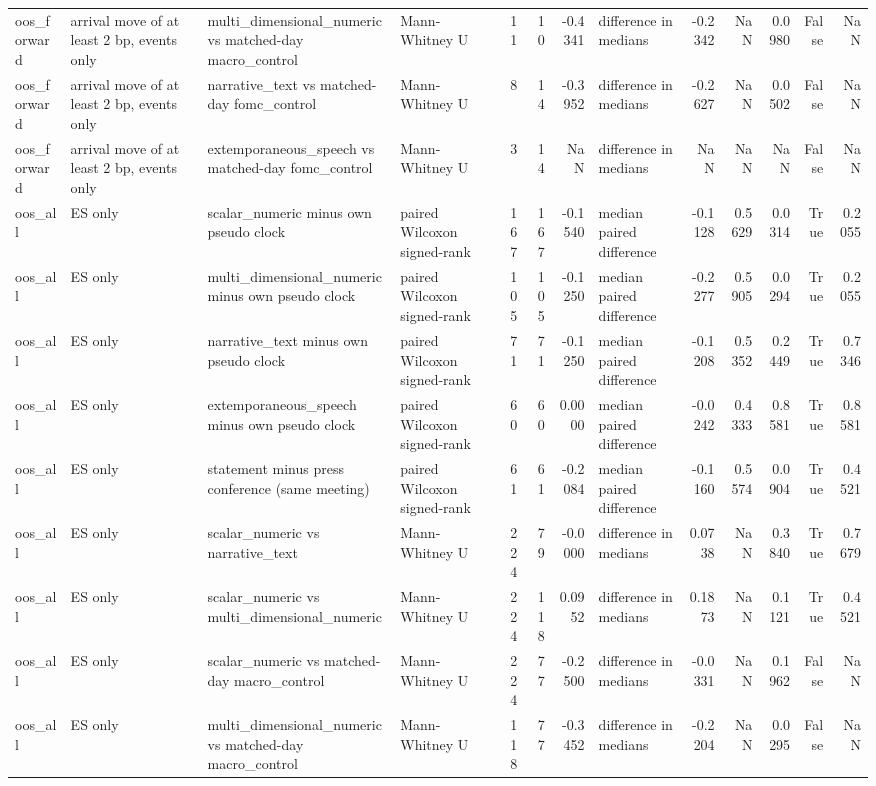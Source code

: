 \begin{tabular}{llllrrrlrrrrr}
oos_forward & arrival move of at least 2 bp, events only & multi_dimensional_numeric vs matched-day macro_control & Mann-Whitney U & 11 & 10 & -0.4341 & difference in medians & -0.2342 & NaN & 0.0980 & False & NaN \\
oos_forward & arrival move of at least 2 bp, events only & narrative_text vs matched-day fomc_control & Mann-Whitney U & 8 & 14 & -0.3952 & difference in medians & -0.2627 & NaN & 0.0502 & False & NaN \\
oos_forward & arrival move of at least 2 bp, events only & extemporaneous_speech vs matched-day fomc_control & Mann-Whitney U & 3 & 14 & NaN & difference in medians & NaN & NaN & NaN & False & NaN \\
oos_all & ES only & scalar_numeric minus own pseudo clock & paired Wilcoxon signed-rank & 167 & 167 & -0.1540 & median paired difference & -0.1128 & 0.5629 & 0.0314 & True & 0.2055 \\
oos_all & ES only & multi_dimensional_numeric minus own pseudo clock & paired Wilcoxon signed-rank & 105 & 105 & -0.1250 & median paired difference & -0.2277 & 0.5905 & 0.0294 & True & 0.2055 \\
oos_all & ES only & narrative_text minus own pseudo clock & paired Wilcoxon signed-rank & 71 & 71 & -0.1250 & median paired difference & -0.1208 & 0.5352 & 0.2449 & True & 0.7346 \\
oos_all & ES only & extemporaneous_speech minus own pseudo clock & paired Wilcoxon signed-rank & 60 & 60 & 0.0000 & median paired difference & -0.0242 & 0.4333 & 0.8581 & True & 0.8581 \\
oos_all & ES only & statement minus press conference (same meeting) & paired Wilcoxon signed-rank & 61 & 61 & -0.2084 & median paired difference & -0.1160 & 0.5574 & 0.0904 & True & 0.4521 \\
oos_all & ES only & scalar_numeric vs narrative_text & Mann-Whitney U & 224 & 79 & -0.0000 & difference in medians & 0.0738 & NaN & 0.3840 & True & 0.7679 \\
oos_all & ES only & scalar_numeric vs multi_dimensional_numeric & Mann-Whitney U & 224 & 118 & 0.0952 & difference in medians & 0.1873 & NaN & 0.1121 & True & 0.4521 \\
oos_all & ES only & scalar_numeric vs matched-day macro_control & Mann-Whitney U & 224 & 77 & -0.2500 & difference in medians & -0.0331 & NaN & 0.1962 & False & NaN \\
oos_all & ES only & multi_dimensional_numeric vs matched-day macro_control & Mann-Whitney U & 118 & 77 & -0.3452 & difference in medians & -0.2204 & NaN & 0.0295 & False & NaN \\

\end{tabular}
